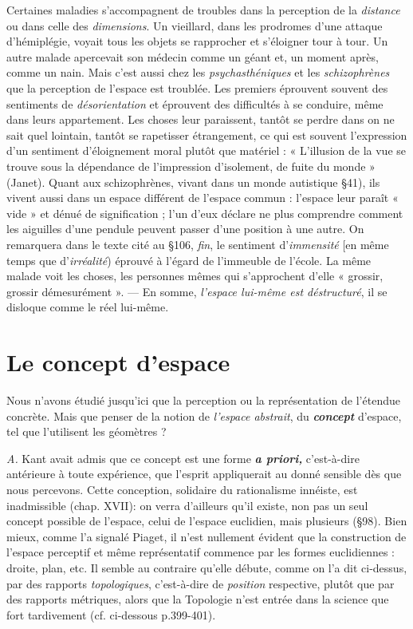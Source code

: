 \vspace{0.24cm}
{\footnotesize Certaines maladies s’accompagnent de troubles
dans la perception de la
{\it distance} ou dans celle des {\it dimensions}. Un vieillard, dans les prodromes
d’une attaque d’hémiplégie, voyait tous les objets se rapprocher et s’éloigner
tour à tour. Un autre malade apercevait son médecin comme un géant
et, un moment après, comme un nain. Mais c'est aussi chez les {\it psychasthéniques}
et les {\it schizophrènes} que la perception de l’espace est troublée.
Les premiers éprouvent souvent des sentiments de {\it désorientation} et
éprouvent des difficultés à se conduire, même dans leurs appartement.
Les choses leur paraissent, tantôt se perdre dans on ne sait quel lointain,
tantôt se rapetisser étrangement, ce qui est souvent l'expression d’un sentiment
d’éloignement moral plutôt que matériel : « L'illusion de la vue se
trouve sous la dépendance de l'impression d'isolement, de fuite du monde »
(Janet). Quant aux schizophrènes, vivant dans un monde autistique
\S 41), ils vivent aussi dans un espace différent de l'espace commun : l’espace
leur paraît « vide » et dénué de signification ; l’un d’eux déclare ne plus
comprendre comment les aiguilles d’une pendule peuvent passer d'une
position à une autre. On remarquera dans le texte cité au \S 106, {\it fin}, le sentiment
d’{\it immensité} [en même temps que d'{\it irréalité}) éprouvé à l’égard de
l'immeuble de l’école. La même malade voit les choses, les personnes mêmes
qui s’approchent d'elle « grossir, grossir démesurément ». — En somme,
{\it l’espace lui-même est déstructuré}, il se disloque comme le réel lui-même.}
\vspace{0.31cm}


\section{Le concept d’espace}%
Nous n’avons étudié jusqu'ici
que la perception ou la représentation de l’étendue concrète. Mais
que penser de la notion de {\it l’espace abstrait}, du \textbf{\textit {concept}} d’espace,
tel que l’utilisent les géomètres ?

{\it A.} Kant avait admis que ce concept est une forme \textbf{\textit {a priori,}} c'est-à-dire
antérieure à toute expérience, que l'esprit appliquerait au
donné sensible dès que nous percevons. Cette conception, solidaire
du rationalisme innéiste, est inadmissible (chap. XVII): on verra
d’ailleurs qu’il existe, non pas un seul concept possible de l’espace,
celui de l’espace euclidien, mais plusieurs (\S 98). Bien mieux, comme
l’a signalé Piaget, il n’est nullement évident que la construction de
l’espace perceptif et même représentatif commence par les formes
euclidiennes : droite, plan, etc. Il semble au contraire qu’elle débute,
comme on l’a dit ci-dessus, par des rapports {\it topologiques}, c’est-à-dire
de {\it position} respective, plutôt que par des rapports métriques, alors
que la Topologie n’est entrée dans la science que fort tardivement
(cf. ci-dessous p.399-401).


